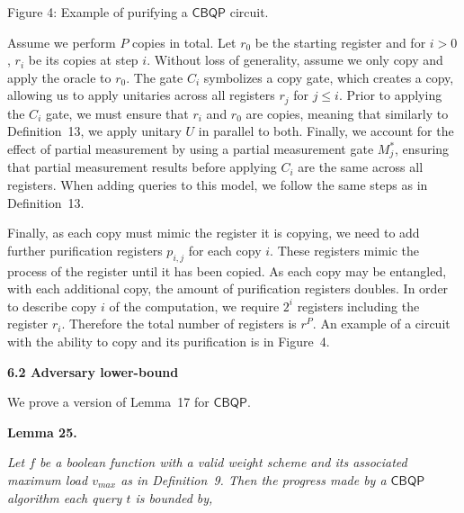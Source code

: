 \documentclass[10pt,a4paper]{article}
\begin{document}
Figure 4: Example of purifying a $\mathsf{CBQP}$ circuit.



Assume we perform $P$ copies in total. Let $r_{0}$ be the starting register and for $i>0$, $r_{i}$ be its copies at step $i$. Without loss of generality, assume we only copy and apply the oracle to $r_{0}$. The gate $C_{i}$ symbolizes a copy gate, which creates a copy, allowing us to apply unitaries across all registers $r_{j}$ for $j\leq i$. Prior to applying the $C_{i}$ gate, we must ensure that $r_{i}$ and $r_{0}$ are copies, meaning that similarly to Definition 13, we apply unitary $U$ in parallel to both. Finally, we account for the effect of partial measurement by using a partial measurement gate $M^{*}_{j}$, ensuring that partial measurement results before applying $C_{i}$ are the same across all registers. When adding queries to this model, we follow the same steps as in Definition 13.\par




Finally, as each copy must mimic the register it is copying, we need to add further purification registers $p_{i,j}$ for each copy $i$. These registers mimic the process of the register until it has been copied. As each copy may be entangled, with each additional copy, the amount of purification registers doubles. In order to describe copy $i$ of the computation, we require $2^{i}$ registers including the register $r_{i}$. Therefore the total number of registers is $r^{P}$. An example of a circuit with the ability to copy and its purification is in Figure 4.\par





\par\medskip\noindent\textbf{
6.2 Adversary lower-bound}\par




We prove a version of Lemma 17 for $\mathsf{CBQP}$.\par





\par\medskip\noindent\textbf{
\textbf{Lemma 25}\textbf{.}
}\par



\emph{Let $f$ be a boolean function with a valid weight scheme and its associated maximum load $v_{max}$ as in Definition 9. Then the progress made by a $\mathsf{CBQP}$ algorithm each query $t$ is bounded by,}\par
\end{document}
